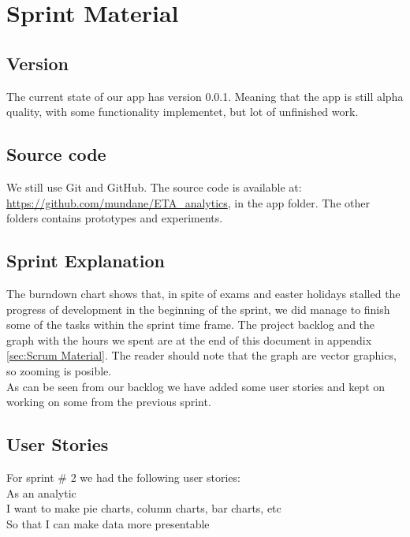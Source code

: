 \section{Sprint Material} %
\label{sec:Sprint Material}
\subsection{Version} %
\label{sub:Version}
The current state of our app has version 0.0.1. Meaning that the app is still alpha quality, with some functionality implementet, but lot of unfinished work.
\subsection{Source code} %
\label{sub:Source code}
We still use Git and GitHub. The source code is available at: \url{https://github.com/mundane/ETA_analytics}, in the app folder. The other folders contains prototypes and experiments.
\subsection{Sprint Explanation}
The burndown chart shows that, in spite of exams and easter holidays stalled the progress of development in the beginning of the sprint, we did manage to finish some of the tasks within the sprint time frame.
The project backlog and the graph with the hours we spent are at the end of this document in appendix \ref{sec:Scrum Material}. The reader should note that the graph are vector graphics, so zooming is posible. \\
As can be seen from our backlog we have added some user stories and kept on working on some from the previous sprint.
\subsection{User Stories}
For sprint \# 2 we had the following user stories: \\
As an analytic \\
I want to make pie charts, column charts, bar charts, etc \\
So that I can make data more presentable \\

